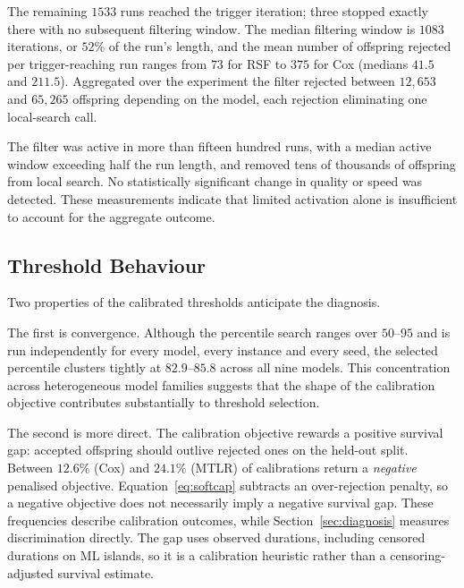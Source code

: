 \documentclass[a4paper,fleqn]{cas-dc}
\begin{document}
The remaining $1533$ runs reached the trigger iteration; three stopped exactly
there with no subsequent filtering window.
The median filtering window is $1083$ iterations, or $52\%$ of the run's length,
and the mean number of offspring rejected per trigger-reaching run ranges from
$73$ for RSF to $375$ for Cox (medians $41.5$ and $211.5$). Aggregated over the experiment the filter rejected between
$12{,}653$ and $65{,}265$ offspring depending on the model, each rejection
eliminating one local-search call.

The filter was active in more than fifteen hundred runs, with a median active
window exceeding half the run length, and removed tens of thousands of offspring
from local search. No statistically significant change in quality or speed was
detected. These measurements indicate that limited activation alone is
insufficient to account for the aggregate outcome.

\subsection{Threshold Behaviour}\label{sec:res-threshold}

Two properties of the calibrated thresholds anticipate the diagnosis.

The first is convergence. Although the percentile search ranges over
$50$--$95$ and is run independently for every model, every instance and every
seed, the selected percentile clusters tightly at $82.9$--$85.8$ across all nine
models. This concentration across heterogeneous model families suggests that the
shape of the calibration objective contributes substantially to threshold
selection.

The second is more direct. The calibration objective rewards a positive survival
gap: accepted offspring should outlive rejected ones on the held-out split.
Between $12.6\%$ (Cox) and $24.1\%$ (MTLR) of calibrations return a
\emph{negative} penalised objective. Equation~\eqref{eq:softcap} subtracts an
over-rejection penalty, so a negative objective does not necessarily imply a
negative survival gap. These frequencies describe calibration outcomes, while
Section~\ref{sec:diagnosis} measures discrimination directly. The gap uses
observed durations, including censored durations on ML islands, so it is a
calibration heuristic rather than a censoring-adjusted survival estimate.
\end{document}
